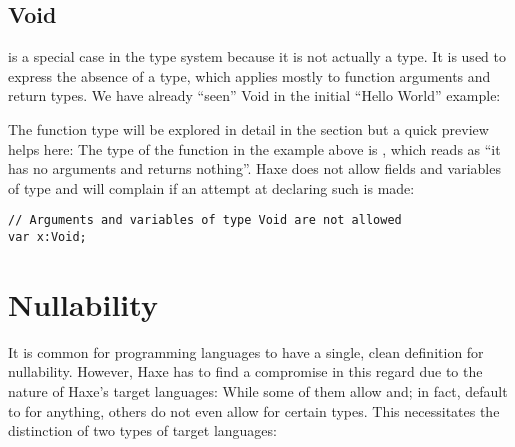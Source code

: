 \subsection{Void}
\label{types-void}


 is a special case in the type system because it is not actually a type. It is used to express the absence of a type, which applies mostly to function arguments and return types.
We have already ``seen'' Void in the initial ``Hello World'' example:


The function type will be explored in detail in the section  but a quick preview helps here: The type of the function  in the example above is , which reads as ``it has no arguments and returns nothing''.
Haxe does not allow fields and variables of type  and will complain if an attempt at declaring such is made:

\begin{lstlisting}
// Arguments and variables of type Void are not allowed
var x:Void;
\end{lstlisting}



\section{Nullability}
\label{types-nullability}


It is common for programming languages to have a single, clean definition for nullability. However, Haxe has to find a compromise in this regard due to the nature of Haxe's target languages: While some of them allow and; in fact, default to  for anything, others do not even allow  for certain types. This necessitates the distinction of two types of target languages:



